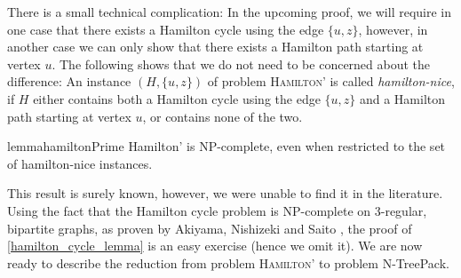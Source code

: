 \documentclass[runningheads]{llncs}
\newcommand{\set}[1]{\{ #1 \}}
\newcommand{\xxxNTP}{{\sc N-TreePack}}
\begin{document}
There is a small technical complication: In the upcoming proof, we will require in one case that there exists a Hamilton cycle using the edge $\set{u,z}$, however, in another case we can only show that there exists a Hamilton path starting at vertex $u$. The following shows that we do not need to be concerned about the difference: An instance $(H, \set{u,z})$ of problem \textsc{Hamilton'}  is called \emph{hamilton-nice}, if $H$ either contains both a Hamilton cycle using the edge $\set{u,z}$ and a Hamilton path starting at vertex $u$, or contains none of the two.

\begin{restatable}{lemma}{hamiltonPrime}
\label{hamilton_cycle_lemma}
\mbox{\sc Hamilton'} is NP-complete, even when restricted to the set of hamilton-nice instances.
\end{restatable} 

This result is surely known, however, we were unable to find it in the literature. Using the fact that the Hamilton cycle problem is NP-complete on 3-regular, bipartite graphs, as proven by Akiyama, Nishizeki and Saito \cite{hamilton3regularBip}, the proof of \cref{hamilton_cycle_lemma} is an easy exercise (hence we omit it). We are now ready to describe the reduction from problem \textsc{Hamilton'} to problem {\xxxNTP}.
\end{document}
